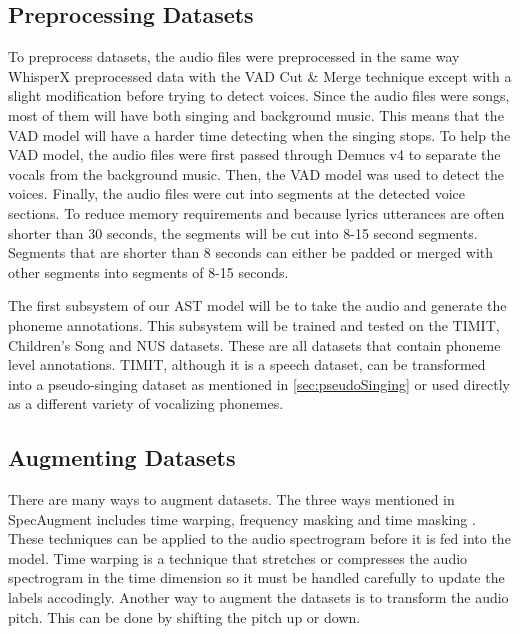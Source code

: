 \documentclass[letterpaper, 12pt]{article}
\begin{document}
\begin{multicols*}{2}
\subsection{Preprocessing Datasets}
To preprocess datasets, the audio files were preprocessed in the same way WhisperX preprocessed
data with the VAD Cut \& Merge technique \citep{whisperX} except with a slight modification before
trying to detect voices. Since the audio files were songs, most of them will have both singing and
background music. This means that the VAD model will have a harder time detecting when the singing
stops. To help the VAD model, the audio files were first passed through Demucs v4 \citep{Demucs}
to separate the vocals from the background music. Then, the VAD model was used to detect the
voices. Finally, the audio files were cut into segments at the detected voice sections. To reduce
memory requirements and because lyrics utterances are often shorter than 30 seconds, the segments
will be cut into 8-15 second segments. Segments that are shorter than 8 seconds can either be padded
or merged with other segments into segments of 8-15 seconds.

The first subsystem of our AST model will be to take the audio and generate the phoneme annotations.
This subsystem will be trained and tested on the TIMIT, Children's Song and NUS datasets. These are
all datasets that contain phoneme level annotations. TIMIT, although it is a speech dataset, can be
transformed into a pseudo-singing dataset as mentioned in \ref{sec:pseudoSinging} or used directly
as a different variety of vocalizing phonemes.

\subsection{Augmenting Datasets}
There are many ways to augment datasets. The three ways mentioned in SpecAugment includes
time warping, frequency masking and time masking \citep{SpecAugment}. These techniques can be
applied to the audio spectrogram before it is fed into the model. Time warping is a technique that
stretches or compresses the audio spectrogram in the time dimension so it must be handled carefully
to update the labels accodingly. Another way to augment the datasets is to transform the audio
pitch. This can be done by shifting the pitch up or down.



\end{multicols*}
\end{document}
